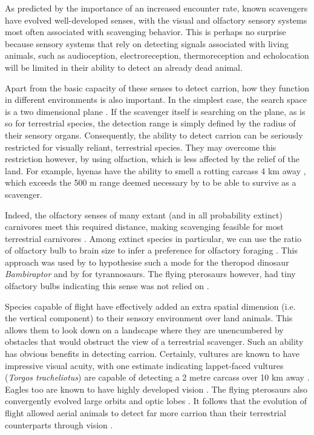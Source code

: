 \documentclass[a4paper,12pt]{article}
\begin{document}
As predicted by the importance of an increased encounter rate, known scavengers have evolved well-developed senses, with the visual and olfactory sensory systems most often associated with scavenging behavior. 
This is perhaps no surprise because sensory systems that rely on detecting signals associated with living animals, such as audioception, electroreception, thermoreception and echolocation will be limited in their ability to detect an already dead animal.

Apart from the basic capacity of these senses to detect carrion, how they function in different environments is also important. 
In the simplest case, the search space is a two dimensional plane \citep{pawar2012dimensionality}. 
If the scavenger itself is searching on the plane, as is so for terrestrial species, the detection range is simply defined by the radius of their sensory organs.
Consequently, the ability to detect carrion can be seriously restricted for visually reliant, terrestrial species. 
They may overcome this restriction however, by using olfaction, which is less affected by the relief of the land.
For example, hyenas have the ability to smell a rotting carcass 4 km away \citep{mills1989comparative}, which exceeds the 500 m range deemed necessary by \cite{ruxton2004obligate} to be able to survive as a scavenger. 

Indeed, the olfactory senses of many extant (and in all probability extinct) carnivores meet this required distance, making scavenging feasible for most terrestrial carnivores \citep{farlow1994speculations,mech2010wolves}. 
Among extinct species in particular, we can use the ratio of olfactory bulb to brain size to infer a preference for olfactory foraging \citep{zelenitsky2011evolution}.
This approach was used by \cite{zelenitsky2011evolution} to hypothesise such a mode for the theropod dinosaur \textit{Bambiraptor} and by \cite{witmer2009new} for tyrannosaurs.
The flying pterosaurs however, had tiny olfactory bulbs indicating this sense was not relied on \citep{witton2013pterosaurs}.

Species capable of flight have effectively added an extra spatial dimension (i.e. the vertical component) to their sensory environment over land animals.
This allows them to look down on a landscape where they are unencumbered by obstacles that would obstruct the view of a terrestrial scavenger.
Such an ability has obvious benefits in detecting carrion.
Certainly, vultures are known to have impressive visual acuity, with one estimate indicating lappet-faced vultures (\textit{Torgos tracheliotus}) are capable of detecting a 2 metre carcass over 10 km away \citep{spiegel2013factors}.
Eagles too are known to have highly developed vision \citep{reymond1985spatial}.
The flying pterosaurs also convergently evolved large orbits and optic lobes \citep{witton2013pterosaurs}. 
It follows that the evolution of flight allowed aerial animals to detect far more carrion than their terrestrial counterparts through vision \citep{AR:AR22815}.
\end{document}
